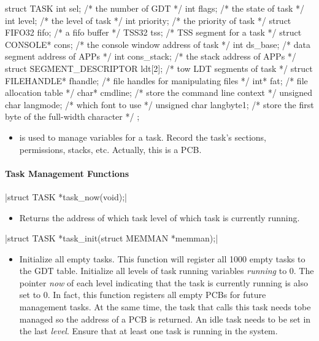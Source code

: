 \documentclass{swfcthesis}
\begin{document}
\begin{codeblock}[1]
\begin{ccode}
struct TASK
{ 
  int sel;              /* the number of GDT */
  int flags;            /* the state of task */
  int level;            /* the level of task */
  int priority;         /* the priority of task */
  struct FIFO32 fifo;   /* a fifo buffer */
  TSS32 tss;            /* TSS segment for a task */
  struct CONSOLE* cons; /* the console window address of task */
  int ds_base;          /* data segment address of APPs */
  int cons_stack;       /* the stack address of APPs */
  struct SEGMENT_DESCRIPTOR ldt[2]; /* tow LDT segments of task */
  struct FILEHANDLE* fhandle; /* file handles for manipulating files */
  int* fat; /* file allocation table */
  char* cmdline; /* store the command line context */
  unsigned char langmode;  /* which font to use */
  unsigned char langbyte1; /* store the first byte of the full-width character */
};
\end{ccode}
\end{codeblock}
\begin{itemize}
\item is used to manage variables for a task. Record the task's sections, permissions,
  stacks, etc. Actually, this is a PCB.
\end{itemize}

\paragraph{Task Management Functions}

\csingle|struct TASK *task_now(void);|
\begin{itemize}
\item Returns the address of which task level of which task is currently running. 
    
\end{itemize}

\csingle|struct TASK *task_init(struct MEMMAN *memman);|
\begin{itemize}
\item Initialize all empty tasks. This
  function will register all 1000 empty tasks to the GDT table. Initialize all levels of
  task running variables \emph{running} to 0. The pointer \emph{now} of each level
  indicating that the task is currently running is also set to 0. In fact, this function
  registers all empty PCBs for future management tasks. At the same time, the task that
  calls this task needs tobe managed so the address of a PCB is returned. An idle task
  needs to be set in the last \emph{level}. Ensure that at least one task is running in the
  system.
  
\end{itemize}
\end{document}
